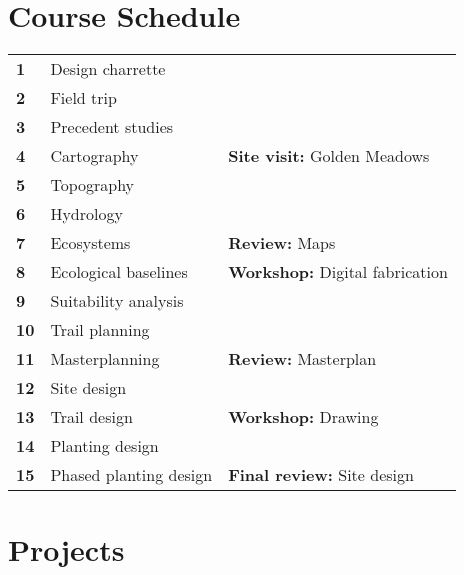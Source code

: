 \documentclass[11pt,article,oneside]{memoir}
\begin{document}

\clearpage

\section{Course Schedule}

\begin{table}[H]
\small
\begin{tabular}{l l @{\hskip 1cm}l}
%
\textbf{1} & Design charrette\\
\textbf{2} & Field trip\\
\textbf{3} & Precedent studies\\
\textbf{4} & Cartography & \textbf{Site visit:} Golden Meadows\\
\textbf{5} & Topography\\
\textbf{6} & Hydrology\\
\textbf{7} & Ecosystems & \textbf{Review:} Maps\\ %
\textbf{8} & Ecological baselines & \textbf{Workshop:} Digital fabrication\\
\textbf{9} & Suitability analysis\\
\textbf{10} & Trail planning\\
\textbf{11} & Masterplanning & \textbf{Review:} Masterplan\\ %
\textbf{12} & Site design\\
\textbf{13} & Trail design & \textbf{Workshop:} Drawing\\
\textbf{14} & Planting design\\
\textbf{15} & Phased planting design & \textbf{Final review:} Site design\\ %
%
\end{tabular}
\end{table}


\section{Projects}
\renewcommand*{\bibfont}{\footnotesize}
\end{document}
